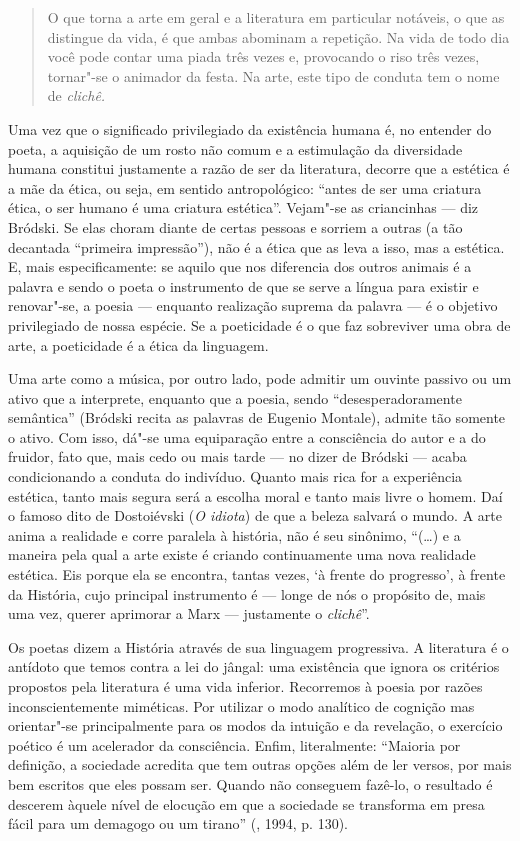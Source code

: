 \begin{quotation}
O que torna a arte em geral e a literatura em particular
notáveis, o que as distingue da vida, é que ambas abominam a repetição. Na vida de todo dia você pode
contar uma piada três vezes e, provocando o riso três vezes, tornar"-se o
animador da festa. Na arte, este tipo de conduta tem o nome de
\emph{clichê.}
\end{quotation}

Uma vez que o significado privilegiado da existência humana é, no
entender do poeta, a aquisição de um rosto não comum e a
estimulação da diversidade humana constitui justamente a razão de ser da
literatura, decorre que a estética é a mãe da ética, ou seja, em sentido
antropológico: ``antes de ser uma criatura ética, o ser humano é uma
criatura estética''. Vejam"-se as criancinhas --- diz Bródski. Se elas
choram diante de certas pessoas e sorriem a outras (a tão decantada
``primeira impressão''), não é a ética que as leva a isso, mas a
estética. E, mais especificamente: se aquilo que nos diferencia
dos outros animais é a palavra e sendo o poeta o instrumento de que se
serve a língua para existir e renovar"-se, a poesia --- enquanto
realização suprema da palavra --- é o objetivo privilegiado de nossa
espécie. Se a poeticidade é o que faz sobreviver uma obra de arte, a
poeticidade é a ética da linguagem.

Uma arte como a música, por outro lado, pode admitir um ouvinte passivo
ou um ativo que a interprete, enquanto que a poesia, sendo
``desesperadoramente semântica'' (Bródski recita as palavras de Eugenio Montale),
 admite tão somente o ativo. Com isso, dá"-se uma
equiparação entre a consciência do autor e a do fruidor, fato que, mais
cedo ou mais tarde --- no dizer de Bródski --- acaba condicionando a
conduta do indivíduo. Quanto mais rica for a experiência estética, tanto
mais segura será a escolha moral e tanto mais livre o homem. Daí o
famoso dito de Dostoiévski (\emph{O idiota}) de que a beleza salvará o mundo. A arte anima
a realidade e corre paralela à história, não é seu sinônimo, ``(\ldots{}) e a
maneira pela qual a arte existe é criando continuamente uma nova
realidade estética. Eis porque ela se encontra, tantas vezes, `à frente
do progresso', à frente da História, cujo principal instrumento é ---
longe de nós o propósito de, mais uma vez, querer aprimorar a Marx ---
justamente o \emph{clichê}''.

Os poetas dizem a História através de sua linguagem progressiva. A
literatura é o antídoto que temos contra a lei do jângal: uma existência
que ignora os critérios propostos pela literatura é uma vida inferior.
Recorremos à poesia por razões inconscientemente miméticas. Por utilizar
o modo analítico de cognição mas orientar"-se principalmente para os
modos da intuição e da revelação, o exercício poético é um acelerador da
consciência. Enfim, literalmente: ``Maioria por definição, a sociedade acredita que tem
outras opções além de ler versos, por mais bem
escritos que eles possam ser. Quando não conseguem fazê-lo, o resultado é descerem àquele nível de
 elocução em que a sociedade se transforma em presa fácil para um 
demagogo ou um tirano'' (, 1994, p. 130).

